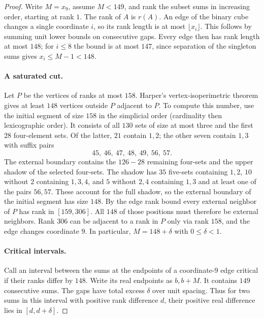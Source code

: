 \documentclass[11pt,letterpaper]{article}
\begin{document}
\begin{proof}
Write $M=x_9$, assume $M<149$, and rank the subset sums in increasing
order, starting at rank $1$. The rank of $A$ is $r(A)$. An edge of
the binary cube changes a single coordinate $i$, so its rank
length is at most $\lfloor x_i\rfloor$. This follows by summing
unit lower bounds on consecutive gaps. Every edge then has rank
length at most $148$; for $i\le8$ the bound is at most $147$,
since separation of the singleton sums gives $x_i\le M-1<148$.

\paragraph{A saturated cut.}
Let $P$ be the vertices of ranks at most $158$. Harper's
vertex-isoperimetric theorem \cite{harper} gives at least $148$
vertices outside $P$ adjacent to $P$. To compute this number,
use the initial segment of size $158$ in the simplicial order
(cardinality then lexicographic order). It consists of all $130$
sets of size at most three and the first $28$ four-element sets.
Of the latter, $21$ contain $1,2$; the other seven contain $1,3$
with suffix pairs
\[
 45,\ 46,\ 47,\ 48,\ 49,\ 56,\ 57 .
\]
The external boundary contains the $126-28$ remaining four-sets
and the upper shadow of the selected four-sets. The shadow has
$35$ five-sets containing $1,2$, $10$ without $2$ containing
$1,3,4$, and $5$ without $2,4$ containing $1,3$ and at least one
of the pairs $56,57$. These account for the full shadow, so
the external boundary of the initial segment has size $148$.
By the edge rank bound every external neighbor of $P$ has rank
in $[159,306]$. All $148$ of those positions must therefore be
external neighbors. Rank $306$ can be adjacent to a rank in $P$
only via rank $158$, and the edge changes coordinate $9$.
In particular, $M=148+\delta$ with $0\le\delta<1$.

\paragraph{Critical intervals.}
Call an interval between the sums at the endpoints of a
coordinate-$9$ edge critical if their ranks differ by $148$.
Write its real endpoints as $b,b+M$. It contains $149$ consecutive
sums. The gaps have total excess $\delta$ over unit spacing.
Thus for two sums in this interval with positive rank difference $d$,
their positive real difference lies in $[d,d+\delta]$.


\end{proof}
\end{document}
